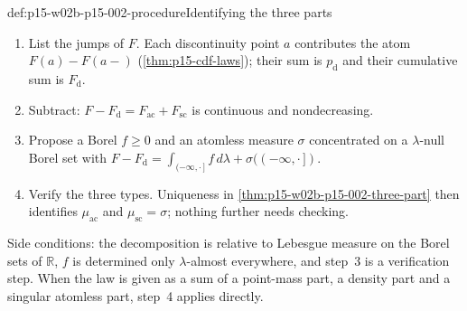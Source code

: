 \begin{hbmethod}{def:p15-w02b-p15-002-procedure}{Identifying the three parts}
\begin{enumerate}
\item List the jumps of \(F\). Each discontinuity point \(a\) contributes
      the atom \(F(a)-F(a-)\) (\cref{thm:p15-cdf-laws}); their sum is
      \(p_{\mathrm d}\) and their cumulative sum is \(F_{\mathrm d}\).
\item Subtract: \(F-F_{\mathrm d}=F_{\mathrm{ac}}+F_{\mathrm{sc}}\) is
      continuous and nondecreasing.
\item Propose a Borel \(f\geq0\) and an atomless measure
      \(\sigma\) concentrated on a \(\lambda\)-null Borel set with
      \(F-F_{\mathrm d}=\int_{(-\infty,\cdot\,]}f\,d\lambda
      +\sigma((-\infty,\cdot\,])\).
\item Verify the three types. Uniqueness in
      \cref{thm:p15-w02b-p15-002-three-part} then identifies
      \(\mu_{\mathrm{ac}}\) and \(\mu_{\mathrm{sc}}=\sigma\); nothing
      further needs checking.
\end{enumerate}
Side conditions: the decomposition is relative to Lebesgue measure on
the Borel sets of \(\mathbb R\), \(f\) is determined only
\(\lambda\)-almost everywhere, and step~3 is a verification step. When the
law is given as a sum of a point-mass part, a density part and a
singular atomless part, step~4 applies directly.
\end{hbmethod}


